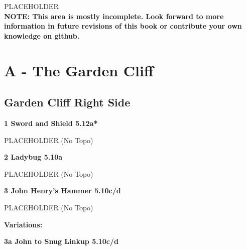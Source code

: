 

\raggedcolumns
\begin{multicols}{2}
\end{multicols}
\begin{multicols}{2}
PLACEHOLDER\\

\textbf{NOTE: This area is mostly incomplete. Look forward to more information in future revisions of this book or contribute your own knowledge on github.}\\
\newpage
		\section{A - The Garden Cliff}\label{sa:The Garden Cliff}
	
	
			\subsection*{Garden Cliff Right Side}\label{bf:Garden Cliff Right Side}
						
					\label{rt:Sword and Shield}
\colorbox{Goldenrod!50}{
\parbox{0.95\linewidth}{
\textbf{
1 Sword and Shield 5.12a*  
}
}
}

					\begin{adjustwidth}{0.5cm}{}				
					PLACEHOLDER
						\newline (No Topo) 
					\end{adjustwidth}
					\label{rt:Ladybug}
\colorbox{RoyalBlue!20}{
\parbox{0.95\linewidth}{
\textbf{
2 Ladybug 5.10a  
}
}
}

					\begin{adjustwidth}{0.5cm}{}				
					PLACEHOLDER
						\newline (No Topo) 
					\end{adjustwidth}
					\label{rt:John Henry's Hammer}
\colorbox{RoyalBlue!20}{
\parbox{0.95\linewidth}{
\textbf{
3 John Henry's Hammer 5.10c/d  
}
}
}

					\begin{adjustwidth}{0.5cm}{}				
					PLACEHOLDER
						\newline (No Topo) 
					\end{adjustwidth}
						\begin{adjustwidth}{0.5cm}{}				
						\textbf{Variations:} \newline
							\label{vr:John to Snug Linkup}
\colorbox{RoyalBlue!20}{
\parbox{0.95\linewidth}{
\textbf{
3a John to Snug Linkup 5.10c/d  
}
}
}


\end{adjustwidth}
\end{multicols}
